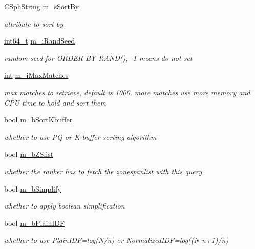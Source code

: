 \begin{DoxyCompactItemize}
\hyperlink{structCSphString}{C\-Sph\-String} \hyperlink{classCSphQuery_a2bc9ee6fd6cfb8756b441d55ff95c3c0}{m\-\_\-s\-Sort\-By}
\begin{DoxyCompactList}\small\item\em attribute to sort by \end{DoxyCompactList}\item 
\hyperlink{sphinxstd_8h_a996e72f71b11a5bb8b3b7b6936b1516d}{int64\-\_\-t} \hyperlink{classCSphQuery_a20f54c618276daa5d4f3b8df8fb14e61}{m\-\_\-i\-Rand\-Seed}
\begin{DoxyCompactList}\small\item\em random seed for O\-R\-D\-E\-R B\-Y R\-A\-N\-D(), -\/1 means do not set \end{DoxyCompactList}\item 
\hyperlink{sphinxexpr_8cpp_a4a26e8f9cb8b736e0c4cbf4d16de985e}{int} \hyperlink{classCSphQuery_a3fd20aed8d54fac63b9a3a2b8b0d9065}{m\-\_\-i\-Max\-Matches}
\begin{DoxyCompactList}\small\item\em max matches to retrieve, default is 1000. more matches use more memory and C\-P\-U time to hold and sort them \end{DoxyCompactList}\item 
bool \hyperlink{classCSphQuery_a1231bf2abf4df49e559d9288e4bb02f1}{m\-\_\-b\-Sort\-Kbuffer}
\begin{DoxyCompactList}\small\item\em whether to use P\-Q or K-\/buffer sorting algorithm \end{DoxyCompactList}\item 
bool \hyperlink{classCSphQuery_a5ebb66c5b5cebc70a288a503afdf5d04}{m\-\_\-b\-Z\-Slist}
\begin{DoxyCompactList}\small\item\em whether the ranker has to fetch the zonespanlist with this query \end{DoxyCompactList}\item 
bool \hyperlink{classCSphQuery_ac3dddf973cfef68ecdb4ce81f3120312}{m\-\_\-b\-Simplify}
\begin{DoxyCompactList}\small\item\em whether to apply boolean simplification \end{DoxyCompactList}\item 
bool \hyperlink{classCSphQuery_a7fcc6af7a9ba80651515e767ba3aab30}{m\-\_\-b\-Plain\-I\-D\-F}
\begin{DoxyCompactList}\small\item\em whether to use Plain\-I\-D\-F=log(N/n) or Normalized\-I\-D\-F=log((N-\/n+1)/n) \end{DoxyCompactList}\item 

\end{DoxyCompactItemize}
